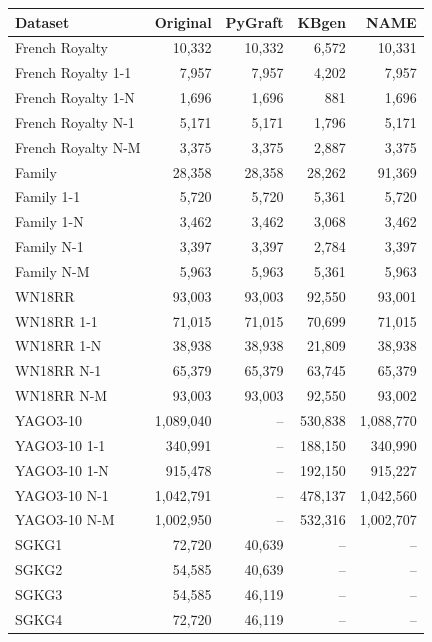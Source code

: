 \begin{tabular}{lrrrr}
\toprule
Dataset & Original & PyGraft & KBgen & NAME \\
\midrule
French Royalty & 10{,}332 & 10{,}332 & 6{,}572 & 10{,}331 \\
French Royalty 1-1 & 7{,}957 & 7{,}957 & 4{,}202 & 7{,}957 \\
French Royalty 1-N & 1{,}696 & 1{,}696 & 881 & 1{,}696 \\
French Royalty N-1 & 5{,}171 & 5{,}171 & 1{,}796 & 5{,}171 \\
French Royalty N-M & 3{,}375 & 3{,}375 & 2{,}887 & 3{,}375 \\
\midrule
Family & 28{,}358 & 28{,}358 & 28{,}262 & 91{,}369 \\
Family 1-1 & 5{,}720 & 5{,}720 & 5{,}361 & 5{,}720 \\
Family 1-N & 3{,}462 & 3{,}462 & 3{,}068 & 3{,}462 \\
Family N-1 & 3{,}397 & 3{,}397 & 2{,}784 & 3{,}397 \\
Family N-M & 5{,}963 & 5{,}963 & 5{,}361 & 5{,}963 \\
\midrule
WN18RR & 93{,}003 & 93{,}003 & 92{,}550 & 93{,}001 \\
WN18RR 1-1 & 71{,}015 & 71{,}015 & 70{,}699 & 71{,}015 \\
WN18RR 1-N & 38{,}938 & 38{,}938 & 21{,}809 & 38{,}938 \\
WN18RR N-1 & 65{,}379 & 65{,}379 & 63{,}745 & 65{,}379 \\
WN18RR N-M & 93{,}003 & 93{,}003 & 92{,}550 & 93{,}002 \\
\midrule
YAGO3-10 & 1{,}089{,}040 & – & 530{,}838 & 1{,}088{,}770 \\
YAGO3-10 1-1 & 340{,}991 & – & 188{,}150 & 340{,}990 \\
YAGO3-10 1-N & 915{,}478 & – & 192{,}150 & 915{,}227 \\
YAGO3-10 N-1 & 1{,}042{,}791 & – & 478{,}137 & 1{,}042{,}560 \\
YAGO3-10 N-M & 1{,}002{,}950 & – & 532{,}316 & 1{,}002{,}707 \\
\midrule
SGKG1 & 72{,}720 & 40{,}639 & – & – \\
SGKG2 & 54{,}585 & 40{,}639 & – & – \\
SGKG3 & 54{,}585 & 46{,}119 & – & – \\
SGKG4 & 72{,}720 & 46{,}119 & – & – \\
\bottomrule
\end{tabular}
